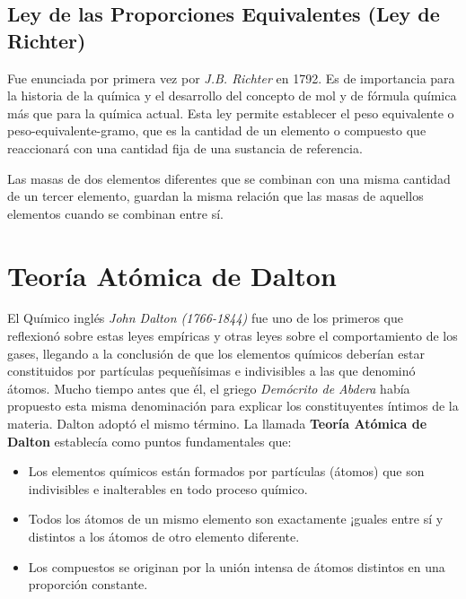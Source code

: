 \subsection{Ley de las Proporciones Equivalentes (Ley de Richter)}

Fue enunciada por primera vez por \emph{J.B. Richter} en 1792. Es de importancia para la historia de la química y el desarrollo del concepto de mol y de fórmula química más que para la química actual. Esta ley permite establecer el peso equivalente o peso-equivalente-gramo, que es la cantidad de un elemento o compuesto que reaccionará con una cantidad fija de una sustancia de referencia.\\

\begin{law}
	
	Las masas de dos elementos diferentes que se combinan con una misma cantidad de un tercer elemento, guardan la misma relación que las masas de aquellos elementos cuando se combinan entre sí.
\end{law}

\section{Teoría Atómica de Dalton}

El Químico inglés \emph{John Dalton (1766-1844)} fue uno de los primeros que reflexionó sobre estas leyes empíricas y otras leyes sobre el comportamiento de los gases, llegando a la conclusión de que los elementos químicos deberían estar constituidos por partículas pequeñísimas e indivisibles a las que denominó átomos. Mucho tiempo antes que él, el griego \emph{Demócrito de Abdera} había propuesto esta misma denominación para explicar los constituyentes íntimos de la materia. Dalton adoptó el mismo término. La llamada \textbf{Teoría Atómica de Dalton} establecía como puntos fundamentales que:

\begin{itemize}
	\item Los elementos químicos están formados por partículas (átomos) que son indivisibles e inalterables en todo proceso químico.\\
	\item Todos los átomos de un mismo elemento son exactamente ¡guales entre sí y distintos a los átomos de otro elemento diferente.\\
	\item Los compuestos se originan por la unión intensa de átomos distintos en una proporción constante.
\end{itemize}

